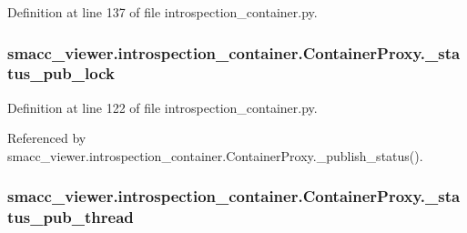Definition at line 137 of file introspection\+\_\+container.\+py.

\subsubsection[{\texorpdfstring{\+\_\+status\+\_\+pub\+\_\+lock}{_status_pub_lock}}]{\setlength{\rightskip}{0pt plus 5cm}smacc\+\_\+viewer.\+introspection\+\_\+container.\+Container\+Proxy.\+\_\+status\+\_\+pub\+\_\+lock\hspace{0.3cm}{\ttfamily [private]}}\hypertarget{classsmacc__viewer_1_1introspection__container_1_1ContainerProxy_a666abcc33df4a2601f414eb66867a634}{}\label{classsmacc__viewer_1_1introspection__container_1_1ContainerProxy_a666abcc33df4a2601f414eb66867a634}


Definition at line 122 of file introspection\+\_\+container.\+py.



Referenced by smacc\+\_\+viewer.\+introspection\+\_\+container.\+Container\+Proxy.\+\_\+publish\+\_\+status().

\subsubsection[{\texorpdfstring{\+\_\+status\+\_\+pub\+\_\+thread}{_status_pub_thread}}]{\setlength{\rightskip}{0pt plus 5cm}smacc\+\_\+viewer.\+introspection\+\_\+container.\+Container\+Proxy.\+\_\+status\+\_\+pub\+\_\+thread\hspace{0.3cm}{\ttfamily [private]}}\hypertarget{classsmacc__viewer_1_1introspection__container_1_1ContainerProxy_a87e0bcbc92c4e5ec369758ea926384b5}{}\label{classsmacc__viewer_1_1introspection__container_1_1ContainerProxy_a87e0bcbc92c4e5ec369758ea926384b5}


